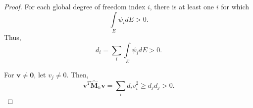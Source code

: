 \documentclass{article}
\newcommand{\M}{\hat{\mathbf{M}}_h}
\newcommand{\integral}[1]{\int \limits_{#1}}
\begin{document}
\begin{proof}
    For each global degree of freedom index $i$, there is at least one $i$ for which
    \begin{equation}
        \nonumber
        \integral{E} \psi_i dE > 0. 
    \end{equation}
    Thus, 
    \begin{equation}
        \nonumber
        d_i = \sum \limits_i \integral{E} \psi_i dE > 0.
    \end{equation}

    For $\mathbf{v} \neq \mathbf{0}$, let $v_j \neq 0$. Then, 
    \begin{equation}
        \nonumber
        \mathbf{v}^T \M \mathbf{v} = \sum \limits_i d_i v_i^2 \geq d_j d_j > 0.
    \end{equation}
\end{proof}
\end{document}
